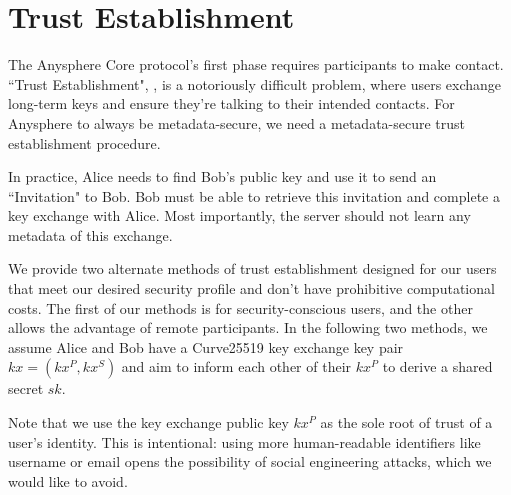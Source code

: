 \newpage
\section{Trust Establishment}
\label{sec:trustestablishment}

The Anysphere Core protocol's first phase requires participants to make contact. ``Trust Establishment", \cite{unger2015sok}, is a notoriously difficult problem, where users exchange long-term keys and ensure they're talking to their intended contacts. For Anysphere to always be metadata-secure, we need a metadata-secure trust establishment procedure.

In practice, Alice needs to find Bob's public key and use it to send an ``Invitation" to Bob. Bob must be able to retrieve this invitation and complete a key exchange with Alice. Most importantly, the server should not learn any metadata of this exchange. 

We provide two alternate methods of trust establishment designed for our users that meet our desired security profile and don't have prohibitive computational costs. The first of our methods is for security-conscious users, and the other allows the advantage of remote participants. In the following two methods, we assume Alice and Bob have a Curve25519 key exchange key pair $kx = (kx^P, kx^S)$ and aim to inform each other of their $kx^P$ to derive a shared secret $sk$. 

Note that we use the key exchange public key $kx^P$ as the sole root of trust of a user's identity. This is intentional: using more human-readable identifiers like username or email opens the possibility of social engineering attacks, which we would like to avoid.







